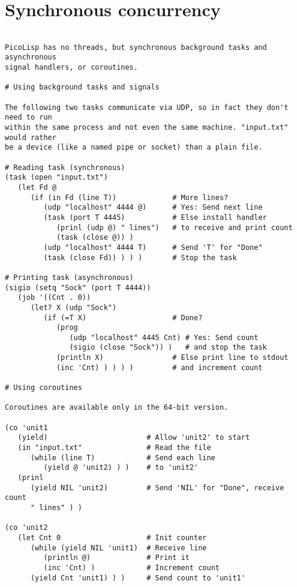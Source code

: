 \section*{Synchronous concurrency}

\begin{verbatim}

PicoLisp has no threads, but synchronous background tasks and asynchronous
signal handlers, or coroutines.

# Using background tasks and signals

The following two tasks communicate via UDP, so in fact they don't need to run
within the same process and not even the same machine. "input.txt" would rather
be a device (like a named pipe or socket) than a plain file.

# Reading task (synchronous)
(task (open "input.txt")
   (let Fd @
      (if (in Fd (line T))             # More lines?
         (udp "localhost" 4444 @)      # Yes: Send next line
         (task (port T 4445)           # Else install handler
            (prinl (udp @) " lines")   # to receive and print count
            (task (close @)) )
         (udp "localhost" 4444 T)      # Send 'T' for "Done"
         (task (close Fd)) ) ) )       # Stop the task

# Printing task (asynchronous)
(sigio (setq "Sock" (port T 4444))
   (job '((Cnt . 0))
      (let? X (udp "Sock")
         (if (=T X)                    # Done?
            (prog
               (udp "localhost" 4445 Cnt) # Yes: Send count
               (sigio (close "Sock")) )   # and stop the task
            (println X)                # Else print line to stdout
            (inc 'Cnt) ) ) ) )         # and increment count

# Using coroutines

Coroutines are available only in the 64-bit version.

(co 'unit1
   (yield)                       # Allow 'unit2' to start
   (in "input.txt"               # Read the file
      (while (line T)            # Send each line
         (yield @ 'unit2) ) )    # to 'unit2'
   (prinl
      (yield NIL 'unit2)         # Send 'NIL' for "Done", receive count
      " lines" ) )

(co 'unit2
   (let Cnt 0                    # Init counter
      (while (yield NIL 'unit1)  # Receive line
         (println @)             # Print it
         (inc 'Cnt) )            # Increment count
      (yield Cnt 'unit1) ) )     # Send count to 'unit1'

\end{verbatim}

